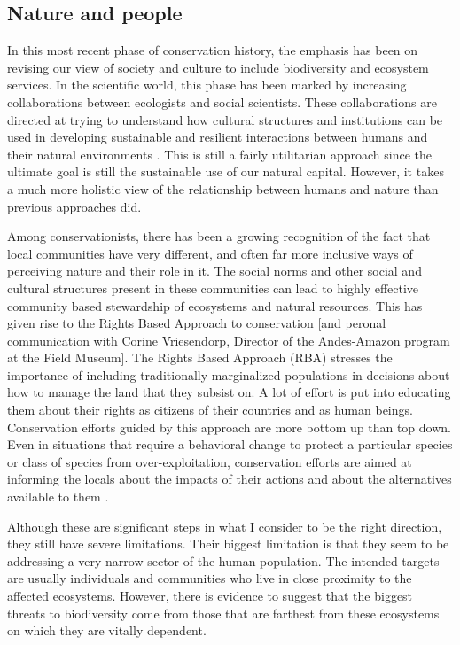 \documentclass[rutwik_proposal.tex]{subfiles}
\begin{document}
\subsection{Nature and people}

In this most recent phase of conservation history, the emphasis has been on revising our view of society and culture to include biodiversity and ecosystem services. In the scientific world, this phase has been marked by increasing collaborations between ecologists and social scientists. These collaborations are directed at trying to understand how cultural structures and institutions can be used in developing sustainable and resilient interactions between humans and their natural environments \cite{Mace14, Ostrom10, Carpenter09}. This is still a fairly utilitarian approach since the ultimate goal is still the sustainable use of our natural capital. However, it takes a much more holistic view of the relationship between humans and nature than previous approaches did.

Among conservationists, there has been a growing recognition of the fact that local communities have very different, and often far more inclusive ways of perceiving nature and their role in it. The social norms and other social and cultural structures present in these communities can lead to highly effective community based stewardship of ecosystems and natural resources. This has given rise to the Rights Based Approach to conservation \cite{Campese09} [and peronal communication with Corine Vriesendorp, Director of the Andes-Amazon program at the Field Museum]. The Rights Based Approach (RBA) stresses the importance of including traditionally marginalized populations in decisions about how to manage the land that they subsist on. A lot of effort is put into educating them about their rights as citizens of their countries and as human beings. Conservation efforts guided by this approach are more bottom up than top down. Even in situations that require a behavioral change to protect a particular species or class of species from over-exploitation, conservation efforts are aimed at informing the locals about the impacts of their actions and about the alternatives available to them \cite{Springer09}.

Although these are significant steps in what I consider to be the right direction, they still have severe limitations. Their biggest limitation is that they seem to be addressing a very narrow sector of the human population. The intended targets are usually individuals and communities who live in close proximity to the affected ecosystems. However, there is evidence to suggest that the biggest threats to biodiversity come from those that are farthest from these ecosystems on which they are vitally dependent.
\end{document}
